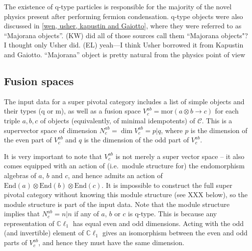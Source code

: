 \documentclass[12pt,a4paper]{article}
\newcommand{\tp}{\otimes}
\newcommand{\mcc}{\mathcal{C}}
\newcommand{\mor}{\text{mor}}
\newcommand{\End}{\text{End}}
\newcommand{\cl}{\mathbb{C}\ell}
\newcommand{\kw}[1]{{\color{kwcolor}\footnotesize{(KW) #1}}}
\newcommand{\ethan}[1]{{\color{amethyst}\footnotesize{(EL) #1}}}
\begin{document}
The existence of q-type particles is responsible for the majority of the novel physics present after performing fermion condensation. 
q-type objects were also discussed in \ref{wen, usher, kapustin and Gaiotto}, where they were referred to as ``Majorana objects''. 
\kw{did all of those sources call them ``Majorana objects"?  I thought only Usher did.}
\ethan{yeah---I think Usher borrowed it from Kapustin and Gaiotto. ``Majorana'' object is pretty natural from the physics point of view}



\subsection{Fusion spaces} \label{fusion_spaces}

The input data for a super pivotal category includes a list of simple objects and their types (q or m), 
as well as a fusion space $V^{ab}_c = \mor(a\tp b \to c)$ for each triple $a,b,c$ of objects (equivalently, of minimal idempotents)
of $\mcc$.
This is a supervector space of dimension
$N^{ab}_c = \dim V^{ab}_c = p|q$, where $p$ is the dimension of the even part
of $V^{ab}_c$ and $q$ is the dimension of the odd part of $V^{ab}_c$.

It is very important to note that $V^{ab}_c$ is not merely a super vector space -- it also comes equipped with an action
of (i.e.\ module structure for) the endomorphism algebras of $a$, $b$ and $c$, and hence admits an action of $\End(a)\tp \End(b)\tp \End(c)$. 
It is impossible to construct the full super pivotal category without knowing this module structure (see XXX below), 
so the module
structure is part of the input data.
Note that the module structure implies that $N^{ab}_c = n|n$ if any of $a$, $b$ or $c$ is q-type.
This is because any representation of $\cl_1$ has equal even and odd dimensions.
Acting with the odd (and invertible) element of $\cl_1$ gives an isomorphism between the even and odd parts of $V^{ab}_c$, and hence they must have the same dimension.
\end{document}
